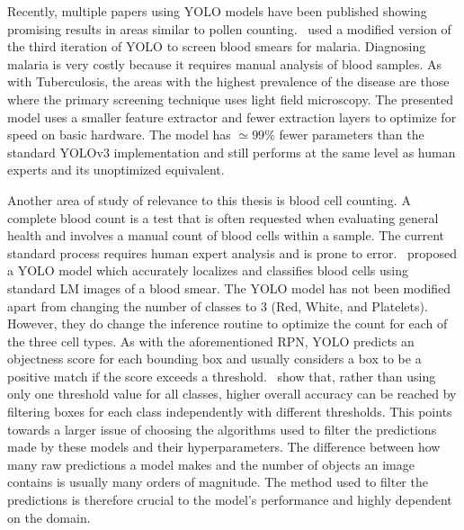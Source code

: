 Recently, multiple papers using YOLO models have been published showing promising results in areas similar to pollen counting.\ \textcite{chibuta_real_time_2020} used a modified version of the third iteration of YOLO to screen blood smears for malaria.
Diagnosing malaria is very costly because it requires manual analysis of blood samples.
As with Tuberculosis, the areas with the highest prevalence of the disease are those where the primary screening technique uses light field microscopy.
The presented model uses a smaller feature extractor and fewer extraction layers to optimize for speed on basic hardware.
The model has \( \simeq 99\% \) fewer parameters than the standard YOLOv3 implementation and still performs at the same level as human experts and its unoptimized equivalent.

Another area of study of relevance to this thesis is blood cell counting.
A complete blood count is a test that is often requested when evaluating general health and involves a manual count of blood cells within a sample.
The current standard process requires human expert analysis and is prone to error.\ \textcite{islam_machine_2019} proposed a YOLO model which accurately localizes and classifies blood cells using standard LM images of a blood smear.
The YOLO model has not been modified apart from changing the number of classes to 3 (Red, White, and Platelets).
However, they do change the inference routine to optimize the count for each of the three cell types.
As with the aforementioned RPN, YOLO predicts an objectness score for each bounding box and usually considers a box to be a positive match if the score exceeds a threshold.\ \citeauthor{islam_machine_2019} show that, rather than using only one threshold value for all classes, higher overall accuracy can be reached by filtering boxes for each class independently with different thresholds.
This points towards a larger issue of choosing the algorithms used to filter the predictions made by these models and their hyperparameters.
The difference between how many raw predictions a model makes and the number of objects an image contains is usually many orders of magnitude.
The method used to filter the predictions is therefore crucial to the model's performance and highly dependent on the domain.

